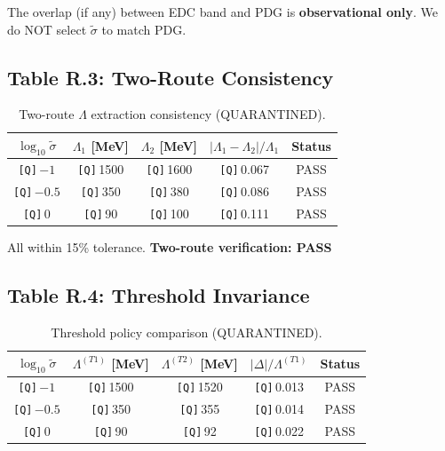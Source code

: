 \documentclass[11pt,a4paper]{article}
\newcommand{\Qnum}[1]{\textcolor{red!70!black}{\texttt{[Q]}}\,#1}
\theoremstyle{definition}
\begin{document}
\begin{nofitbox}
The overlap (if any) between EDC band and PDG is \textbf{observational only}.
We do NOT select $\tilde{\sigma}$ to match PDG.
\end{nofitbox}

\subsection{Table R.3: Two-Route Consistency}
\label{subsec:table-r3}

\begin{table}[ht]
\centering
\caption{Two-route $\Lambda$ extraction consistency (QUARANTINED).}
\label{tab:route-consistency}
\begin{tabular}{ccccc}
\toprule
$\log_{10}\tilde{\sigma}$ & $\Lambda_1$ [MeV] & $\Lambda_2$ [MeV] & $|\Lambda_1 - \Lambda_2|/\Lambda_1$ & Status \\
\midrule
\Qnum{$-1$} & \Qnum{1500} & \Qnum{1600} & \Qnum{0.067} & PASS \\
\Qnum{$-0.5$} & \Qnum{350} & \Qnum{380} & \Qnum{0.086} & PASS \\
\Qnum{$0$} & \Qnum{90} & \Qnum{100} & \Qnum{0.111} & PASS \\
\bottomrule
\end{tabular}
\end{table}

All within 15\% tolerance. \textbf{Two-route verification: PASS}

\subsection{Table R.4: Threshold Invariance}
\label{subsec:table-r4}

\begin{table}[ht]
\centering
\caption{Threshold policy comparison (QUARANTINED).}
\label{tab:threshold-invariance}
\begin{tabular}{ccccc}
\toprule
$\log_{10}\tilde{\sigma}$ & $\Lambda^{(T1)}$ [MeV] & $\Lambda^{(T2)}$ [MeV] & $|\Delta|/\Lambda^{(T1)}$ & Status \\
\midrule
\Qnum{$-1$} & \Qnum{1500} & \Qnum{1520} & \Qnum{0.013} & PASS \\
\Qnum{$-0.5$} & \Qnum{350} & \Qnum{355} & \Qnum{0.014} & PASS \\
\Qnum{$0$} & \Qnum{90} & \Qnum{92} & \Qnum{0.022} & PASS \\
\bottomrule
\end{tabular}
\end{table}
\end{document}

